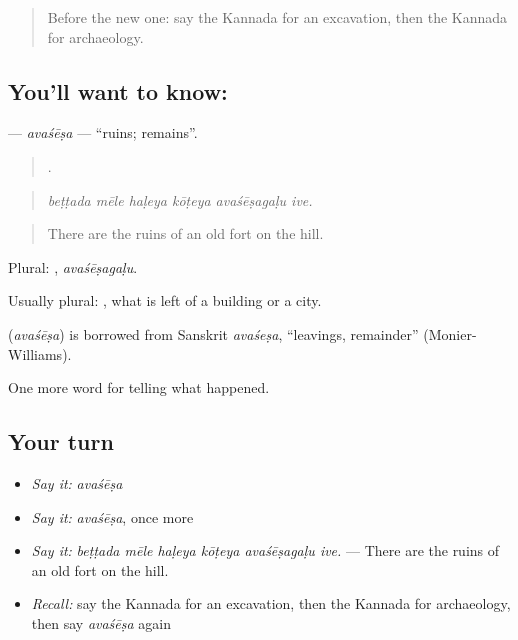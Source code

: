 \label{lesson:KA-C355-avasesa}



\begin{quote}
Before the new one: say the Kannada for an excavation, then the Kannada for archaeology.
\end{quote}

\subsection*{You'll want to know: }
\textbf{} — \emph{avaśēṣa} — \textquotedblleft{}ruins; remains\textquotedblright{}.

\begin{quote}
     .
\end{quote}

\begin{quote}
\emph{beṭṭada mēle haḷeya kōṭeya avaśēṣagaḷu ive.}
\end{quote}

\begin{quote}
There are the ruins of an old fort on the hill.
\end{quote}

Plural: , \emph{avaśēṣagaḷu}.

Usually plural: , what is left of a building or a city.

\begin{cousinweb}
\textbf{} (\emph{avaśēṣa}) is borrowed from Sanskrit \emph{avaśeṣa}, \textquotedblleft{}leavings, remainder\textquotedblright{} (Monier-Williams).
\end{cousinweb}

\begin{grammarlens}[title={What you've built}]
One more word for telling what happened.
\end{grammarlens}

\subsection*{Your turn}
\begin{itemize}
\raggedright
  \item \emph{Say it:} \emph{avaśēṣa}
  \item \emph{Say it:} \emph{avaśēṣa}, once more
  \item \emph{Say it:} \emph{beṭṭada mēle haḷeya kōṭeya avaśēṣagaḷu ive.} — There are the ruins of an old fort on the hill.
  \item \emph{Recall:} say the Kannada for an excavation, then the Kannada for archaeology, then say \emph{avaśēṣa} again
\end{itemize}

